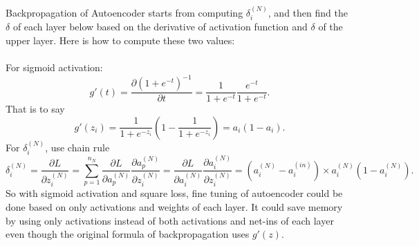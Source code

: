 \documentclass[12pt]{article}
\begin{document}
Backpropagation of Autoencoder starts from computing $\delta_i^{(N)}$, and then find the $\delta$ of each layer below based on the derivative of activation function and $\delta$ of the upper layer. Here is how to compute these two values:\\
\\
For sigmoid activation:
\begin{equation}
g'(t) = \frac{\partial{(1+e^{-t})^{-1}}}{\partial{t}} = \frac{1}{1+e^{-t}}\frac{e^{-t}}{1+e^{-t}}.
\end{equation}
That is to say\begin{equation}
g'(z_i) = \frac{1}{1+e^{-z_i}}(1-\frac{1}{1+e^{-z_i}})=a_i(1-a_i).
\end{equation}
For $\delta_i^{(N)}$, use chain rule\begin{equation}
\delta_i^{(N)} = \frac{\partial L}{\partial z^{(N)}_i}=\sum_{p=1}^{n_N} \frac{\partial L}{\partial a^{(N)}_p} \frac{\partial a^{(N)}_p}{\partial z^{(N)}_i} = \frac{\partial L}{\partial a^{(N)}_i} \frac{\partial a^{(N)}_i}{\partial z^{(N)}_i} = (a^{(N)}_i-a^{(in)}_i)\times a^{(N)}_i(1-a^{(N)}_i).
\end{equation}
So with sigmoid activation and square loss, fine tuning of autoencoder could be done based on only activations and weights of each layer. It could save memory by using only activations instead of both activations and net-ins of each layer even though the original formula of backpropagation uses $g'(z)$.
\end{document}
